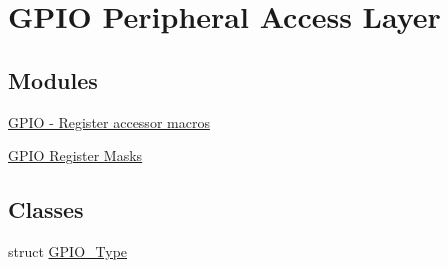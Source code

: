\hypertarget{group__GPIO__Peripheral__Access__Layer}{}\section{G\+P\+IO Peripheral Access Layer}
\label{group__GPIO__Peripheral__Access__Layer}
\subsection*{Modules}
\begin{DoxyCompactItemize}
\item 
\hyperlink{group__GPIO__Register__Accessor__Macros}{G\+P\+I\+O -\/ Register accessor macros}
\item 
\hyperlink{group__GPIO__Register__Masks}{G\+P\+I\+O Register Masks}
\end{DoxyCompactItemize}
\subsection*{Classes}
\begin{DoxyCompactItemize}
\item 
struct \hyperlink{structGPIO__Type}{G\+P\+I\+O\+\_\+\+Type}
\end{DoxyCompactItemize}
